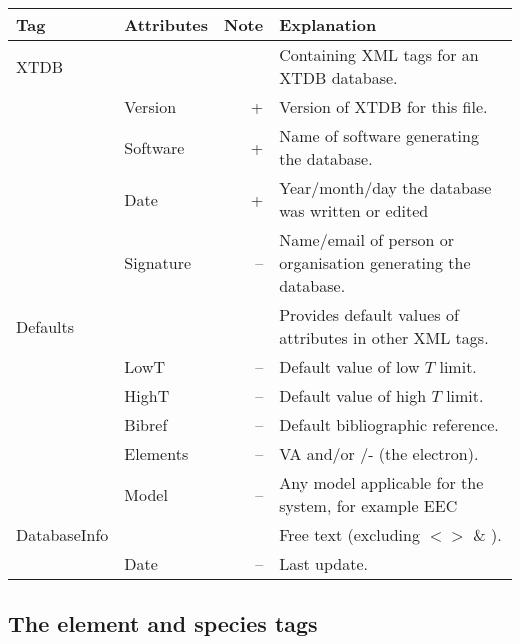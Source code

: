 \documentclass{article}
\begin{document}
\bigskip
\begin{tabular}{|p{} p{} r p{}|}\hline
  Tag & Attributes & Note & Explanation\\\hline

  XTDB    & && Containing XML tags for an XTDB database.\\
          & Version & + & Version of XTDB for this file.\\
          &Software & + & Name of software generating the database.\\
          &Date     & + & Year/month/day the database was written or edited\\
          &Signature& -- & Name/email of person or organisation generating the database.\\\hline
  
  Defaults & && Provides default values of attributes in other XML tags.\\
           & LowT & -- & Default value of low $T$ limit.\\
           & HighT & -- & Default value of high $T$ limit.\\
           & Bibref & -- & Default bibliographic reference. \\
           & Elements & -- & VA and/or /- (the electron).\\
           & Model & -- & Any model applicable for the system, for example EEC\\\hline

  DatabaseInfo & && Free text (excluding $< >$ \& ).\\
  & Date & -- & Last update.\\\hline

\end{tabular}

\newpage

\subsection{The element and species tags}
\end{document}
